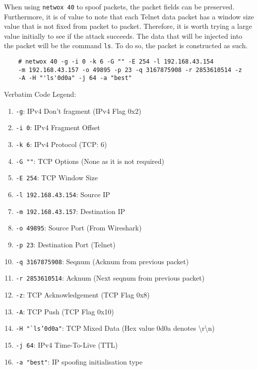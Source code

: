 \documentclass[a4paper,12pt]{article}
\begin{document}
\begin{par}
\noindent When using \texttt{netwox 40} to spoof packets, the packet fields can be preserved. Furthermore, it is of value to note that each Telnet data packet has a window size value that is not fixed from packet to packet. Therefore, it is worth trying a large value initially to see if the attack succeeds. The data that will be injected into the packet will be the command \texttt{ls}. To do so, the packet is constructed as such.
\end{par}
	\begin{verbatim}
	# netwox 40 -g -i 0 -k 6 -G "" -E 254 -l 192.168.43.154 
	-m 192.168.43.157 -o 49895 -p 23 -q 3167875908 -r 2853610514 -z 
	-A -H "'ls'0d0a" -j 64 -a "best"
	\end{verbatim}
\begin{par}
\noindent Verbatim Code Legend:
	\begin{enumerate} \itemsep0em 
		\item \texttt{-g}: IPv4 Don't fragment (IPv4 Flag 0x2)
		\item \texttt{-i 0}: IPv4 Fragment Offset
		\item \texttt{-k 6}: IPv4 Protocol (TCP: 6)
		\item \texttt{-G ""}: TCP Options (None as it is not required)
		\item \texttt{-E 254}: TCP Window Size
		\item \texttt{-l 192.168.43.154}: Source IP
		\item \texttt{-m 192.168.43.157}: Destination IP
		\item \texttt{-o 49895}: Source Port (From Wireshark)
		\item \texttt{-p 23}: Destination Port (Telnet)
		\item \texttt{-q 3167875908}: Seqnum (Acknum from previous packet)
		\item \texttt{-r 2853610514}: Acknum (Next seqnum from previous packet) 
		\item \texttt{-z}: TCP Acknowledgement (TCP Flag 0x8)
		\item \texttt{-A}: TCP Push (TCP Flag 0x10)
		\item \texttt{-H "`ls'0d0a"}: TCP Mixed Data (Hex value 0d0a denotes \textbackslash r\textbackslash n)
		\item \texttt{-j 64}: IPv4 Time-To-Live (TTL)
		\item \texttt{-a "best"}: IP spoofing initialisation type
	\end{enumerate}
\end{par}
\end{document}
